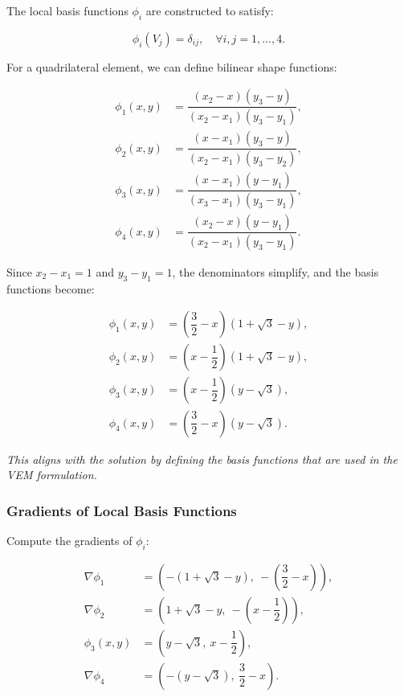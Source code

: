 \documentclass[class=article, crop=false]{standalone}
\begin{document}
The local basis functions $\phi_i$ are constructed to satisfy:

\[
\phi_i(V_j) = \delta_{ij}, \quad \forall i, j = 1, \dots, 4.
\]

For a quadrilateral element, we can define bilinear shape functions:

\begin{align*}
\phi_1(x, y) &= \dfrac{(x_2 - x)(y_3 - y)}{(x_2 - x_1)(y_3 - y_1)}, \\
\phi_2(x, y) &= \dfrac{(x - x_1)(y_3 - y)}{(x_2 - x_1)(y_3 - y_2)}, \\
\phi_3(x, y) &= \dfrac{(x - x_1)(y - y_1)}{(x_3 - x_1)(y_3 - y_1)}, \\
\phi_4(x, y) &= \dfrac{(x_2 - x)(y - y_1)}{(x_2 - x_1)(y_3 - y_1)}.
\end{align*}

Since $x_2 - x_1 = 1$ and $y_3 - y_1 = 1$, the denominators simplify, and the basis functions become:

\begin{align*}
\phi_1(x, y) &= \left( \dfrac{3}{2} - x \right) \left( 1 + \sqrt{3} - y \right), \\
\phi_2(x, y) &= \left( x - \dfrac{1}{2} \right) \left( 1 + \sqrt{3} - y \right), \\
\phi_3(x, y) &= \left( x - \dfrac{1}{2} \right) \left( y - \sqrt{3} \right), \\
\phi_4(x, y) &= \left( \dfrac{3}{2} - x \right) \left( y - \sqrt{3} \right).
\end{align*}

\noindent
\textit{This aligns with the solution by defining the basis functions that are used in the VEM formulation.}

\subsubsection{Gradients of Local Basis Functions}

Compute the gradients of $\phi_i$:

\begin{align*}
\nabla \phi_1 &= \left( - (1 + \sqrt{3} - y),\ - \left( \dfrac{3}{2} - x \right) \right), \\
\nabla \phi_2 &= \left( 1 + \sqrt{3} - y,\ - \left( x - \dfrac{1}{2} \right) \right), \\
\phi_3(x, y) &= \left( y - \sqrt{3},\ x - \dfrac{1}{2} \right), \\
\nabla \phi_4 &= \left( - (y - \sqrt{3}),\ \dfrac{3}{2} - x \right).
\end{align*}
\end{document}
